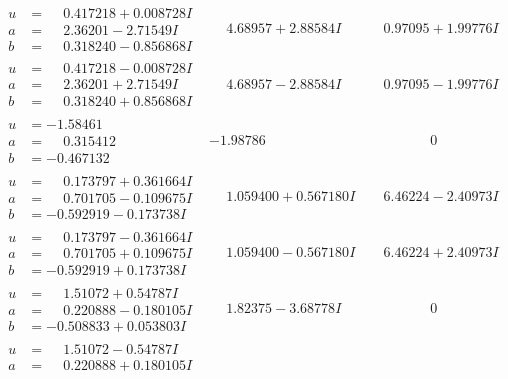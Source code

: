 \documentclass[1p]{elsarticle_modified}
\theoremstyle{definition}
\begin{document}
$$\begin{array}{c|c|c}
\begin{aligned}
u &= \phantom{-}0.417218 + 0.008728 I \\
a &= \phantom{-}2.36201 - 2.71549 I \\
b &= \phantom{-}0.318240 - 0.856868 I\end{aligned}
 & \phantom{-}4.68957 + 2.88584 I & \phantom{-}0.97095 + 1.99776 I \\ \hline\begin{aligned}
u &= \phantom{-}0.417218 - 0.008728 I \\
a &= \phantom{-}2.36201 + 2.71549 I \\
b &= \phantom{-}0.318240 + 0.856868 I\end{aligned}
 & \phantom{-}4.68957 - 2.88584 I & \phantom{-}0.97095 - 1.99776 I \\ \hline\begin{aligned}
u &= -1.58461\phantom{ +0.000000I} \\
a &= \phantom{-}0.315412\phantom{ +0.000000I} \\
b &= -0.467132\phantom{ +0.000000I}\end{aligned}
 & -1.98786\phantom{ +0.000000I} & \phantom{-0.000000 } 0 \\ \hline\begin{aligned}
u &= \phantom{-}0.173797 + 0.361664 I \\
a &= \phantom{-}0.701705 - 0.109675 I \\
b &= -0.592919 - 0.173738 I\end{aligned}
 & \phantom{-}1.059400 + 0.567180 I & \phantom{-}6.46224 - 2.40973 I \\ \hline\begin{aligned}
u &= \phantom{-}0.173797 - 0.361664 I \\
a &= \phantom{-}0.701705 + 0.109675 I \\
b &= -0.592919 + 0.173738 I\end{aligned}
 & \phantom{-}1.059400 - 0.567180 I & \phantom{-}6.46224 + 2.40973 I \\ \hline\begin{aligned}
u &= \phantom{-}1.51072 + 0.54787 I \\
a &= \phantom{-}0.220888 - 0.180105 I \\
b &= -0.508833 + 0.053803 I\end{aligned}
 & \phantom{-}1.82375 - 3.68778 I & \phantom{-0.000000 } 0 \\ \hline\begin{aligned}
u &= \phantom{-}1.51072 - 0.54787 I \\
a &= \phantom{-}0.220888 + 0.180105 I \\

\end{aligned}
\end{array}$$
\end{document}
